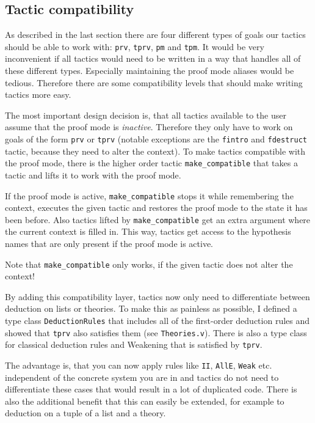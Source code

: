 \documentclass[12pt, a4paper]{article}
\begin{document}
\subsection{Tactic compatibility}

As described in the last section there are four different types of goals our tactics should be able to work with: \texttt{prv}, \texttt{tprv}, \texttt{pm} and \texttt{tpm}.
It would be very inconvenient if all tactics would need to be written in a way that handles all of these different types.
Especially maintaining the proof mode aliases would be tedious.
Therefore there are some compatibility levels that should make writing tactics more easy.

\medskip\noindent
The most important design decision is, that all tactics available to the user assume that the proof mode is \emph{inactive}.
Therefore they only have to work on goals of the form \texttt{prv} or \texttt{tprv} (notable exceptions are the \texttt{fintro} and \texttt{fdestruct} tactic, because they need to alter the context).
To make tactics compatible with the proof mode, there is the higher order tactic \texttt{make\_compatible} that takes a tactic and lifts it to work with the proof mode.

If the proof mode is active, \texttt{make\_compatible} stops it while remembering the context, executes the given tactic and  restores the proof mode to the state it has been before.
Also tactics lifted by \texttt{make\_compatible} get an extra argument where the current context is filled in.
This way, tactics get access to the hypothesis names that are only present if the proof mode is active.

Note that \texttt{make\_compatible} only works, if the given tactic does not alter the context!

\medskip\noindent
By adding this compatibility layer, tactics now only need to differentiate between deduction on lists or theories.
To make this as painless as possible, I defined a type class \texttt{DeductionRules} that includes all of the first-order deduction rules and showed that \texttt{tprv} also satisfies them (see \texttt{Theories.v}).
There is also a type class for classical deduction rules and Weakening that is satisfied by \texttt{tprv}.

The advantage is, that you can now apply rules like \texttt{II}, \texttt{AllE}, \texttt{Weak} etc. independent of the concrete system you are in and tactics do not need to differentiate these cases that would result in a lot of duplicated code.
There is also the additional benefit that this can easily be extended, for example to deduction on a tuple of a list and a theory.
\end{document}
